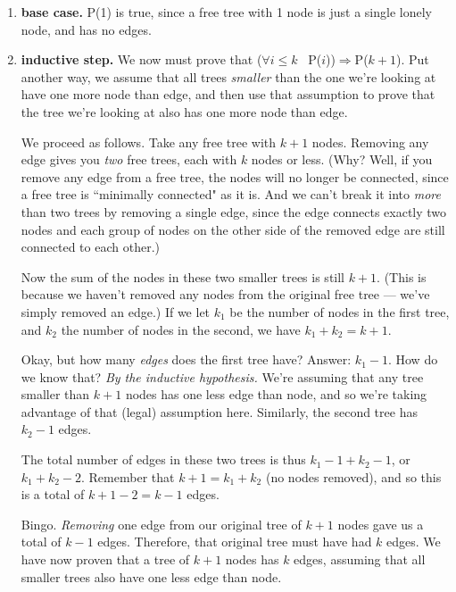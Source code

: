 \begin{enumerate} 

\item \textbf{base case.} P(1) is true, since a free tree with 1 node is
just a single lonely node, and has no edges.

\item \textbf{inductive step.}
We now must prove that ($\forall i \leq k$ \ P($i$))$\Rightarrow$P($k+1$).
Put another way, we assume that all trees \textit{smaller} than the one
we're looking at have one more node than edge, and then use that
assumption to prove that the tree we're looking at also has one more node
than edge. 

We proceed as follows. Take any free tree with $k+1$ nodes. Removing any
edge gives you \textit{two} free trees, each with $k$ nodes or less. (Why?
Well, if you remove any edge from a free tree, the nodes will no longer be
connected, since a free tree is ``minimally connected" as it is. And we
can't break it into \textit{more} than two trees by removing a single edge,
since the edge connects exactly two nodes and each group of nodes on the
other side of the removed edge are still connected to each other.)

Now the sum of the nodes in these two smaller trees is still $k+1$. (This
is because we haven't removed any nodes from the original free tree ---
we've simply removed an edge.) If we let $k_1$ be the number of nodes in
the first tree, and $k_2$ the number of nodes in the second, we have $k_1 +
k_2 = k + 1$.

Okay, but how many \textit{edges} does the first tree have? Answer: $k_1 -
1$. How do we know that? \textit{By the inductive hypothesis.} We're
assuming that any tree smaller than $k+1$ nodes has one less edge than
node, and so we're taking advantage of that (legal) assumption here.
Similarly, the second tree has $k_2 - 1$ edges.

The total number of edges in these two trees is thus $k_1 - 1 + k_2 - 1$,
or $k_1 + k_2 - 2$. Remember that $k+1 = k_1 + k_2$ (no nodes removed), and
so this is a total of $k+1-2 = k-1$ edges.

Bingo. \textit{Removing} one edge from our original tree of $k+1$ nodes
gave us a total of $k-1$ edges. Therefore, that original tree must have had
$k$ edges. We have now proven that a tree of $k+1$ nodes has $k$ edges,
assuming that all smaller trees also have one less edge than node.

\end{enumerate}


